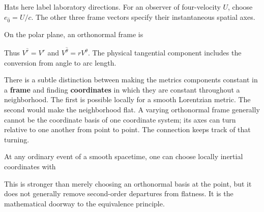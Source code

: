 \documentclass[
  11pt,
  letterpaper,
  oneside,
  openany]{scrbook}
\begin{document}
\begin{center}
\begingroup
{}
\ifdim\wd\grmathbox>\linewidth
\resizebox{\linewidth}{!}{\usebox{\grmathbox}}
\else\usebox{\grmathbox}\fi
\endgroup
\end{center}

Hats here label laboratory directions. For an observer of four-velocity
\(U\), choose \(e_{\hat0}=U/c\). The other three frame vectors specify
their instantaneous spatial axes.

On the polar plane, an orthonormal frame is

\begin{center}
\begingroup
{}
\ifdim\wd\grmathbox>\linewidth
\resizebox{\linewidth}{!}{\usebox{\grmathbox}}
\else\usebox{\grmathbox}\fi
\endgroup
\end{center}

Thus \(V^{\hat r}=V^r\) and \(V^{\hat\theta}=rV^\theta\). The physical
tangential component includes the conversion from angle to arc length.

There is a subtle distinction between making the
metric\textquotesingle s components constant in a \textbf{frame} and
finding \textbf{coordinates} in which they are constant throughout a
neighborhood. The first is possible locally for a smooth Lorentzian
metric. The second would make the neighborhood flat. A varying
orthonormal frame generally cannot be the coordinate basis of one
coordinate system; its axes can turn relative to one another from point
to point. The connection keeps track of that turning.

At any ordinary event of a smooth spacetime, one can choose locally
inertial coordinates with

\begin{center}
\begingroup
{}
\ifdim\wd\grmathbox>\linewidth
\resizebox{\linewidth}{!}{\usebox{\grmathbox}}
\else\usebox{\grmathbox}\fi
\endgroup
\end{center}

This is stronger than merely choosing an orthonormal basis at the point,
but it does not generally remove second-order departures from flatness.
It is the mathematical doorway to the equivalence principle.
\end{document}
